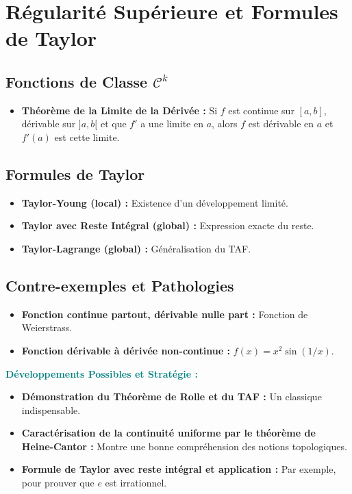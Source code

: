 \documentclass[12pt, a4paper, parskip=full]{report}
\theoremstyle{agregstyle}
\newenvironment{developpements}
  {\par\medskip\noindent\begin{oframed}\noindent\textbf{\textcolor{teal}{Développements Possibles et Stratégie :}}}
  {\end{oframed}\par\medskip}
\begin{document}
\section{Régularité Supérieure et Formules de Taylor}
\subsection{Fonctions de Classe $\mathcal{C}^k$}
\begin{itemize}
    \item \textbf{Théorème de la Limite de la Dérivée :} Si $f$ est continue sur $[a,b]$, dérivable sur $]a,b[$ et que $f'$ a une limite en $a$, alors $f$ est dérivable en $a$ et $f'(a)$ est cette limite.
\end{itemize}
\subsection{Formules de Taylor}
\begin{itemize}
    \item \textbf{Taylor-Young (local) :} Existence d'un développement limité.
    \item \textbf{Taylor avec Reste Intégral (global) :} Expression exacte du reste.
    \item \textbf{Taylor-Lagrange (global) :} Généralisation du TAF.
\end{itemize}
\subsection{Contre-exemples et Pathologies}
\begin{itemize}
    \item \textbf{Fonction continue partout, dérivable nulle part :} Fonction de Weierstrass.
    \item \textbf{Fonction dérivable à dérivée non-continue :} $f(x)=x^2\sin(1/x)$.
\end{itemize}

\begin{developpements}
    \begin{itemize}
        \item \textbf{Démonstration du Théorème de Rolle et du TAF :} Un classique indispensable.
        \item \textbf{Caractérisation de la continuité uniforme par le théorème de Heine-Cantor :} Montre une bonne compréhension des notions topologiques.
        \item \textbf{Formule de Taylor avec reste intégral et application :} Par exemple, pour prouver que $e$ est irrationnel.
    \end{itemize}
\end{developpements}
\end{document}
